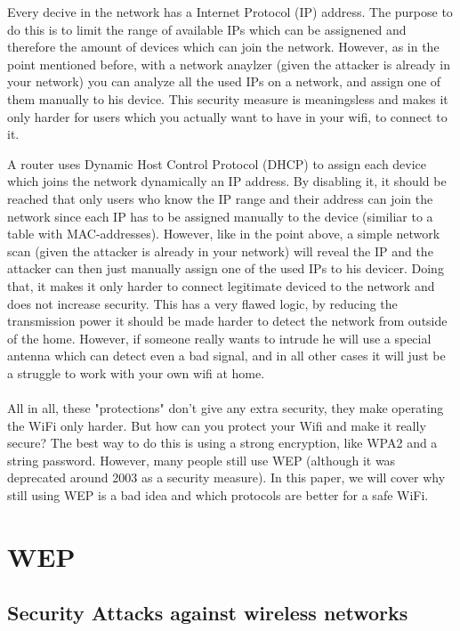 \documentclass[a4paper,12pt,pagesize,headsepline,bibtotoc,titlepage]{scrartcl}
\begin{document}
Every decive in the network has a Internet Protocol (IP) address. The purpose to do this is to limit the range of available IPs which can be assignened and therefore the amount of devices which can join the network. However, as in the point mentioned before, with a network anaylzer (given  the attacker is already in your network) you can analyze all the used IPs on a network, and assign one of them manually to his device. This security measure is meaningsless and makes it only harder for users which you actually want to have in your wifi, to connect to it.

A router uses Dynamic Host Control Protocol (DHCP) to assign each device which joins the network dynamically an IP address. By disabling it, it should be reached that only users who know the IP range and their address can join the network since each IP has to be assigned manually to the device (similiar to a table with MAC-addresses). However, like in the point above, a simple network scan (given  the attacker is already in your network) will reveal the IP and the attacker can then just manually assign one of the used IPs to his devicer. Doing that, it makes it only harder to connect legitimate deviced to the network and does not increase security.
This has a very flawed logic, by reducing the transmission power it should be made harder to detect the network from outside of the home. However, if someone really wants to intrude he will use a special antenna which can detect even a bad signal, and in all other cases it will just be a struggle to work with your own wifi at home.
\\
\\
All in all, these "protections" don't give any extra security, they make operating the WiFi only harder.
But how can you protect your Wifi and make it really secure?
The best way to do this is using a strong encryption, like WPA2 and a string password.
However, many people still use WEP (although it was deprecated around 2003 as a security measure). In this paper, we will cover why still using WEP is a bad idea and which protocols are better for a safe WiFi.

\newpage
\section{WEP}
\subsection{Security Attacks against wireless networks}
\end{document}
